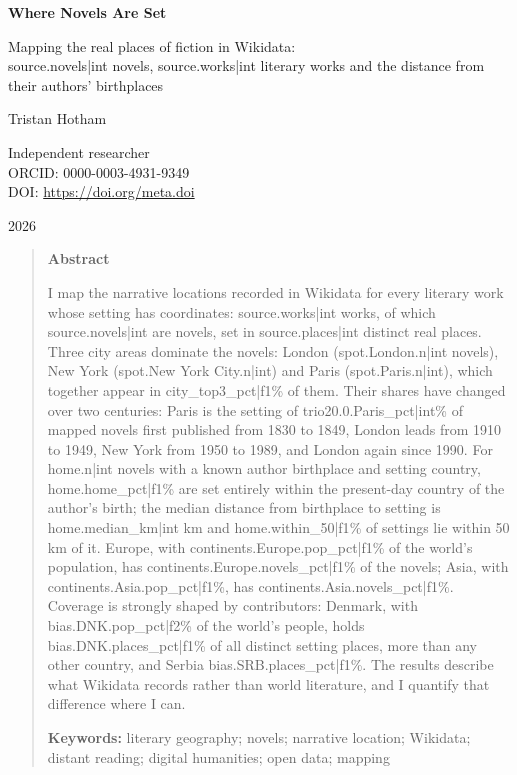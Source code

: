\documentclass[11pt,a4paper]{article}
\begin{document}
\begin{center}
{\Large\bfseries Where Novels Are Set\par}
\vspace{0.4em}
{\large Mapping the real places of fiction in Wikidata:\\{{source.novels|int}} novels, {{source.works|int}} literary works and the distance from their authors' birthplaces\par}
\vspace{1.2em}
{\large Tristan Hotham\par}
\vspace{0.3em}
{\small Independent researcher\\
ORCID: 0000-0003-4931-9349\\
DOI: \href{https://doi.org/{{meta.doi}}}{https://doi.org/{{meta.doi}}}\par}
\vspace{0.8em}
2026
\end{center}

\begin{quote}
\small
\begin{center}\textbf{Abstract}\end{center}
I map the narrative locations recorded in Wikidata for every literary work whose setting has coordinates: {{source.works|int}} works, of which {{source.novels|int}} are novels, set in {{source.places|int}} distinct real places. Three city areas dominate the novels: London ({{spot.London.n|int}} novels), New York ({{spot.New York City.n|int}}) and Paris ({{spot.Paris.n|int}}), which together appear in {{city_top3_pct|f1}}\% of them. Their shares have changed over two centuries: Paris is the setting of {{trio20.0.Paris_pct|int}}\% of mapped novels first published from 1830 to 1849, London leads from 1910 to 1949, New York from 1950 to 1989, and London again since 1990. For {{home.n|int}} novels with a known author birthplace and setting country, {{home.home_pct|f1}}\% are set entirely within the present-day country of the author's birth; the median distance from birthplace to setting is {{home.median_km|int}} km and {{home.within_50|f1}}\% of settings lie within 50 km of it. Europe, with {{continents.Europe.pop_pct|f1}}\% of the world's population, has {{continents.Europe.novels_pct|f1}}\% of the novels; Asia, with {{continents.Asia.pop_pct|f1}}\%, has {{continents.Asia.novels_pct|f1}}\%. Coverage is strongly shaped by contributors: Denmark, with {{bias.DNK.pop_pct|f2}}\% of the world's people, holds {{bias.DNK.places_pct|f1}}\% of all distinct setting places, more than any other country, and Serbia {{bias.SRB.places_pct|f1}}\%. The results describe what Wikidata records rather than world literature, and I quantify that difference where I can.

\textbf{Keywords:} literary geography; novels; narrative location; Wikidata; distant reading; digital humanities; open data; mapping
\end{quote}
\end{document}
